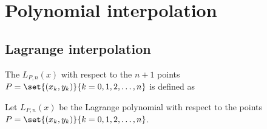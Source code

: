 



\section{Polynomial interpolation}
\subsection{Lagrange interpolation}
\begin{definition}
\label{def:Ln(x)}
\label{def:lagpoly}
\label{def:laginterp}
The  $L_{P,n}(x)$ with respect to the $n+1$ points \\
$P=\set{(x_k,y_k)}{k=0,1,2,\ldots,n}$ is defined as
\end{definition}

\begin{proposition}
Let $L_{P,n}(x)$ be the Lagrange polynomial with respect to the points\\
$P=\set{(x_k,y_k)}{k=0,1,2,\ldots,n}$.
\end{proposition}

